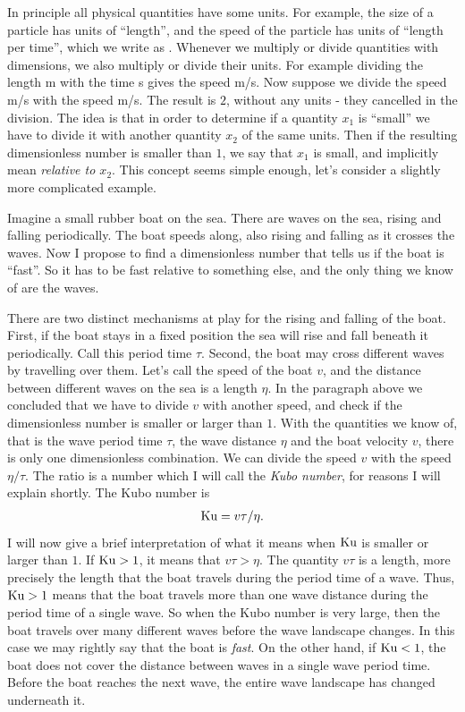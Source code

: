 \documentclass[thesis.tex]{subfiles}
\begin{document}
In principle all physical quantities have some units. For example, the size of a particle has units of ``length'', and the speed of the particle has units of ``length per time'', which we write as . Whenever we multiply or divide quantities with dimensions, we also multiply or divide their units. For example dividing the length \unit[20]{m} with the time \unit[5]{s} gives the speed \unit[4]{m/s}. Now suppose we divide the speed \unit[4]{m/s} with the speed \unit[2]{m/s}. The result is $2$, without any units - they cancelled in the division. The idea is that in order to determine if a quantity $x_1$ is ``small'' we have to divide it with another quantity $x_2$ of the same units. Then if the resulting dimensionless number is smaller than $1$, we say that $x_1$ is small, and implicitly mean \emph{relative to $x_2$}.  This concept seems simple enough, let's consider a slightly more complicated example.

Imagine a small rubber boat on the sea. There are waves on the sea, rising and falling periodically.  The boat speeds along, also rising and falling as it crosses the waves. Now I propose to find a dimensionless number that tells us if the boat is ``fast''. So it has to be fast relative to something else, and the only thing we know of are the waves. 

There are two distinct mechanisms at play for the rising and falling of the boat. First, if the boat stays in a fixed position the sea will rise and fall beneath it periodically. Call this period time $\tau$. Second, the boat may cross different waves by travelling over them. Let's call the speed of the boat $v$, and the distance between different waves on the sea is a length $\eta$. In the paragraph above we concluded that we have to divide $v$ with another speed, and check if the dimensionless number is smaller or larger than $1$. With the quantities we know of, that is the wave period time $\tau$, the wave distance $\eta$ and the boat velocity $v$, there is only one dimensionless combination. We can divide the speed $v$ with the speed $\eta/\tau$. The ratio is a number which I will call the \emph{Kubo number}, for reasons I will explain shortly. The Kubo number is
\begin{align*}
\mbox{Ku} = v\tau/\eta.
\end{align*}
I will now give a brief interpretation of what it means when $\mbox{Ku}$ is smaller or larger than $1$. If $\mbox{Ku} > 1$, it means that $v\tau > \eta$. The quantity $v\tau$ is a length, more precisely the length that the boat travels during the period time of a wave. Thus, $\mbox{Ku} > 1$ means that the boat travels more than one wave distance during the period time of a single wave. So when the Kubo number is very large, then the boat travels over many different waves before the wave landscape changes. In this case we may rightly say that the boat is \emph{fast}. On the other hand, if $\mbox{Ku}<1$, the boat does not cover the distance between waves in a single wave period time. Before the boat reaches the next wave, the entire wave landscape has changed underneath it.
\end{document}
